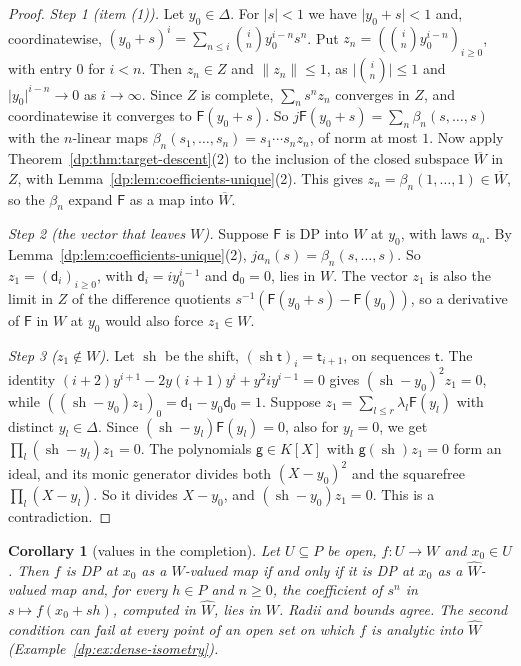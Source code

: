 \documentclass[11pt]{amsart}
\newtheorem{corollary}[theorem]{Corollary}
\theoremstyle{definition}
\theoremstyle{remark}
\numberwithin{equation}{section}
\newcommand{\abs}[1]{\lvert #1\rvert}
\newcommand{\norm}[1]{\lVert #1\rVert}
\theoremstyle{plain}
\theoremstyle{definition}
\theoremstyle{plain}
\newcommand{\sh}{\operatorname{sh}}
\begin{document}
\begin{proof}
\emph{Step 1 (item (1)).} Let $y_0\in\Delta$. For $\abs s<1$ we have $\abs{y_0+s}<1$ and, coordinatewise, $(y_0+s)^i=\sum_{n\le i}\binom iny_0^{i-n}s^n$. Put $z_n=(\binom iny_0^{i-n})_{i\ge0}$, with entry $0$ for $i<n$. Then $z_n\in Z$ and $\norm{z_n}\le1$, as $\abs{\binom in}\le1$ and $\abs{y_0}^{i-n}\to0$ as $i\to\infty$. Since $Z$ is complete, $\sum_ns^nz_n$ converges in $Z$, and coordinatewise it converges to $\mathsf F(y_0+s)$. So $j\mathsf F(y_0+s)=\sum_n\beta_n(s,\dots,s)$ with the $n$-linear maps $\beta_n(s_1,\dots,s_n)=s_1\cdots s_nz_n$, of norm at most $1$. Now apply Theorem~\ref{dp:thm:target-descent}(2) to the inclusion of the closed subspace $\overline W$ in $Z$, with Lemma~\ref{dp:lem:coefficients-unique}(2). This gives $z_n=\beta_n(1,\dots,1)\in\overline W$, so the $\beta_n$ expand $\mathsf F$ as a map into $\overline W$.

\emph{Step 2 (the vector that leaves $W$).} Suppose $\mathsf F$ is DP into $W$ at $y_0$, with laws $a_n$. By Lemma~\ref{dp:lem:coefficients-unique}(2), $ja_n(s)=\beta_n(s,\dots,s)$. So $z_1=(\mathsf d_i)_{i\ge0}$, with $\mathsf d_i=iy_0^{i-1}$ and $\mathsf d_0=0$, lies in $W$. The vector $z_1$ is also the limit in $Z$ of the difference quotients $s^{-1}(\mathsf F(y_0+s)-\mathsf F(y_0))$, so a derivative of $\mathsf F$ in $W$ at $y_0$ would also force $z_1\in W$.

\emph{Step 3 ($z_1\notin W$).} Let $\sh$ be the shift, $(\sh\mathsf t)_i=\mathsf t_{i+1}$, on sequences $\mathsf t$. The identity $(i+2)y^{i+1}-2y(i+1)y^i+y^2iy^{i-1}=0$ gives $(\sh-y_0)^2z_1=0$, while $((\sh-y_0)z_1)_0=\mathsf d_1-y_0\mathsf d_0=1$. Suppose $z_1=\sum_{l\le r}\lambda_l\mathsf F(y_l)$ with distinct $y_l\in\Delta$. Since $(\sh-y_l)\mathsf F(y_l)=0$, also for $y_l=0$, we get $\prod_l(\sh-y_l)z_1=0$. The polynomials $\mathsf g\in K[X]$ with $\mathsf g(\sh)z_1=0$ form an ideal, and its monic generator divides both $(X-y_0)^2$ and the squarefree $\prod_l(X-y_l)$. So it divides $X-y_0$, and $(\sh-y_0)z_1=0$. This is a contradiction.
\end{proof}

\begin{corollary}[values in the completion]\label{dp:cor:completion}
Let $U\subseteq P$ be open, $f\colon U\to W$ and $x_0\in U$. Then $f$ is DP at $x_0$ as a $W$-valued map if and only if it is DP at $x_0$ as a $\widehat W$-valued map and, for every $h\in P$ and $n\ge0$, the coefficient of $s^n$ in $s\mapsto f(x_0+sh)$, computed in $\widehat W$, lies in $W$. Radii and bounds agree. The second condition can fail at every point of an open set on which $f$ is analytic into $\widehat W$ (Example~\ref{dp:ex:dense-isometry}).
\end{corollary}
\end{document}
